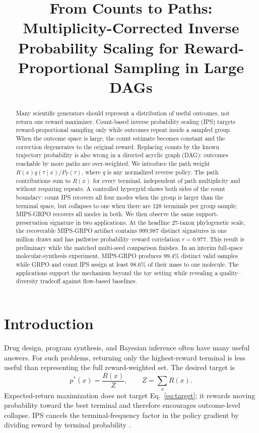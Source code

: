 \documentclass[11pt]{article}
\title{From Counts to Paths: Multiplicity-Corrected Inverse Probability
Scaling for Reward-Proportional Sampling in Large DAGs}
\author{}
\date{}
\begin{document}
\maketitle

\begin{abstract}
Many scientific generators should represent a distribution of useful outcomes,
not return one reward maximizer. Count-based inverse probability scaling (IPS)
targets reward-proportional sampling only while outcomes repeat inside a sampled
group. When the outcome space is large, the count estimate becomes constant and
the correction degenerates to the original reward. Replacing counts by the
known trajectory probability is also wrong in a directed acyclic graph (DAG):
outcomes reachable by more paths are over-weighted. We introduce the path
weight \(R(x)q(\tau\mid x)/P_F(\tau)\), where \(q\) is any normalized reverse
policy. The path contributions sum to \(R(x)\) for every terminal, independent
of path multiplicity and without requiring repeats. A controlled hypergrid
shows both sides of the count boundary: count IPS recovers all four modes when
the group is larger than the terminal space, but collapses to one when there
are 128 terminals per group sample; MIPS-GRPO recovers all modes in both. We
then observe the same support-preservation signature in two applications. At
the headline 27-taxon phylogenetic scale, the recoverable MIPS-GRPO artifact
contains 999,987 distinct signatures in one million draws and has pathwise
probability--reward correlation \(r=0.977\). This result is preliminary while
the matched multi-seed comparison finishes. In an
interim full-space molecular-synthesis experiment, MIPS-GRPO produces 99.4\%
distinct valid samples while GRPO and count IPS assign at least 98.6\% of their
mass to one molecule. The applications support the mechanism beyond the toy
setting while revealing a quality--diversity tradeoff against flow-based
baselines.
\end{abstract}

\section{Introduction}

Drug design, program synthesis, and Bayesian inference often have many useful
answers. For such problems, returning only the highest-reward terminal is less
useful than representing the full reward-weighted set. The desired target is
\begin{equation}
 p^*(x)=\frac{R(x)}{Z}, \qquad Z=\sum_x R(x).
 \label{eq:target}
\end{equation}
Expected-return maximization does not target Eq.~\eqref{eq:target}; it rewards
moving probability toward the best terminal and therefore encourages
outcome-level collapse. IPS cancels the terminal-frequency factor in the
policy gradient by dividing reward by terminal probability
\citep{sinha2026ips}.
\end{document}
